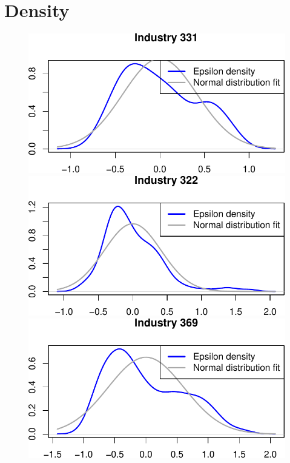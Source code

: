 \documentclass[
  12pt]{article}
\theoremstyle{definition}
\theoremstyle{remark}
\begin{document}
\section{Density}\label{density}

\begin{figure}

\begin{minipage}{\linewidth}

\includegraphics{Tax-Prod_files/figure-pdf/unnamed-chunk-44-1.pdf}

\includegraphics{Tax-Prod_files/figure-pdf/unnamed-chunk-44-2.pdf}

\includegraphics{Tax-Prod_files/figure-pdf/unnamed-chunk-44-3.pdf}


\end{minipage}
\end{figure}
\end{document}
